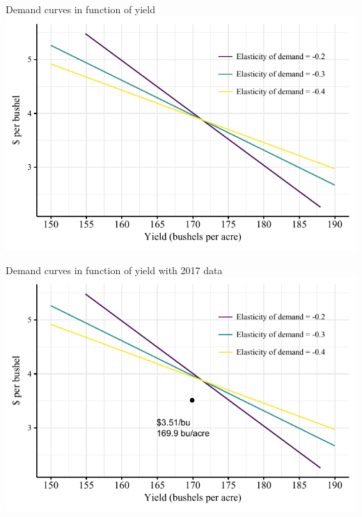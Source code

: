 \documentclass[table,xcolor=pdftex,dvipsnames, handout]{beamer}\usepackage[]{graphicx}\usepackage[]{color}
\makeatletter
\def\maxwidth{ %
  \ifdim\Gin@nat@width>\linewidth
    \linewidth
  \else
    \Gin@nat@width
  \fi
}
\newenvironment{knitrout}{}{} %
\makeatother
\begin{document}

\begin{frame}{Demand curves in function of yield}
\begin{knitrout}
\color{fgcolor}
\includegraphics[width=\maxwidth]{figure/figure_demand_plot2-1} 

\end{knitrout}
\end{frame}


\begin{frame}{Demand curves in function of yield with 2017 data}
\begin{knitrout}
\color{fgcolor}
\includegraphics[width=\maxwidth]{figure/figure_retro-1} 

\end{knitrout}
\end{frame}
\end{document}

